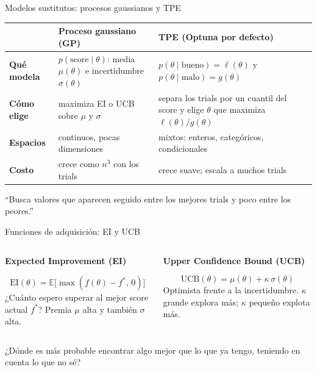 \documentclass[aspectratio=169,12pt]{beamer}
\newcommand{\colhead}[1]{\textbf{#1}\par\vspace{2pt}}
\newcommand{\hrow}{\rowcolor{mlcream}}
\begin{document}
\begin{frame}{Modelos sustitutos: procesos gaussianos y TPE}
  \centering\footnotesize
  \begin{tabular}{@{}l L{0.37\textwidth} L{0.37\textwidth}@{}}
    \toprule
    \hrow & \textbf{Proceso gaussiano (GP)} & \textbf{TPE (Optuna por defecto)} \\
    \midrule
    \textbf{Qué modela} & $p(\text{score} \mid \theta)$: media $\mu(\theta)$ e incertidumbre $\sigma(\theta)$ & $p(\theta \mid \text{bueno}) = \ell(\theta)$ y $p(\theta \mid \text{malo}) = g(\theta)$ \\
    \textbf{Cómo elige} & maximiza EI o UCB sobre $\mu$ y $\sigma$ & separa los trials por un cuantil del score y elige $\theta$ que maximiza $\ell(\theta)/g(\theta)$ \\
    \textbf{Espacios} & continuos, pocas dimensiones & mixtos: enteros, categóricos, condicionales \\
    \textbf{Costo} & crece como $n^3$ con los trials & crece suave; escala a muchos trials \\
    \bottomrule
  \end{tabular}
  \raggedright
  \begin{keybox}
    \small ``Busca valores que aparecen seguido entre los mejores trials y poco entre los peores.''
  \end{keybox}
\end{frame}

\begin{frame}{Funciones de adquisición: EI y UCB}
  \begin{columns}[T]
    \begin{column}{0.5\textwidth}
      \colhead{Expected Improvement (EI)}
      \[ \text{EI}(\theta) = \mathbb{E}\big[\max(f(\theta) - f^{*},\, 0)\big] \]
      \small ¿Cuánto espero superar al mejor score actual $f^{*}$? Premia $\mu$ alta y también $\sigma$ alta.
    \end{column}
    \begin{column}{0.46\textwidth}
      \colhead{Upper Confidence Bound (UCB)}
      \[ \text{UCB}(\theta) = \mu(\theta) + \kappa\,\sigma(\theta) \]
      \small Optimista frente a la incertidumbre. $\kappa$ grande explora más; $\kappa$ pequeño explota más.
    \end{column}
  \end{columns}
  \vspace{8pt}
  \begin{goldbox}
    \small ¿Dónde es más probable encontrar algo mejor que lo que ya tengo, teniendo en cuenta lo que no sé?
  \end{goldbox}
\end{frame}
\end{document}
